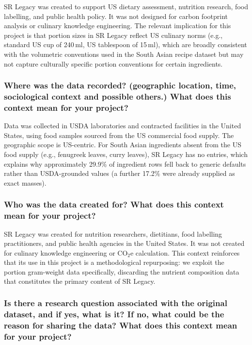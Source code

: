 \documentclass{article}
\newcommand{\question}[1]{#1}
\begin{document}
SR Legacy was created to support US dietary assessment, nutrition research, food labelling, and public health policy. It was not designed for carbon footprint analysis or culinary knowledge engineering. The relevant implication for this project is that portion sizes in SR Legacy reflect US culinary norms (e.g., standard US cup of 240\,ml, US tablespoon of 15\,ml), which are broadly consistent with the volumetric conventions used in the South Asian recipe dataset but may not capture culturally specific portion conventions for certain ingredients.

\question{\subsubsection*{Where was the data recorded? (geographic location, time, sociological context and possible others.) What does this context mean for your project?}}

Data was collected in USDA laboratories and contracted facilities in the United States, using food samples sourced from the US commercial food supply. The geographic scope is US-centric. For South Asian ingredients absent from the US food supply (e.g., fenugreek leaves, curry leaves), SR Legacy has no entries, which explains why approximately 29.9\% of ingredient rows fell back to generic defaults rather than USDA-grounded values (a further 17.2\% were already supplied as exact masses).

\question{\subsubsection*{Who was the data created for? What does this context mean for your project?}}

SR Legacy was created for nutrition researchers, dietitians, food labelling practitioners, and public health agencies in the United States. It was not created for culinary knowledge engineering or CO$_2$e calculation. This context reinforces that its use in this project is a methodological repurposing: we exploit the portion gram-weight data specifically, discarding the nutrient composition data that constitutes the primary content of SR Legacy.

\question{\subsubsection*{Is there a research question associated with the original dataset, and if yes, what is it? If no, what could be the reason for sharing the data? What does this context mean for your project?}}
\end{document}
